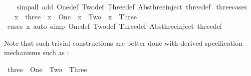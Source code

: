 \begin{isabellebody}
%
\isadelimproof
\ \ %
\endisadelimproof
%
\isatagproof
{}\isamarkupfalse%
\ {}simp{}all\ add{}\ One{}def\ Two{}def\ Three{}def\ Abs{}three{}inject\ three{}def{}%
\endisatagproof
{\isafoldproof}%
%
\isadelimproof
\isanewline
%
\endisadelimproof
\isanewline
{}\isamarkupfalse%
\ three{}cases{}\isanewline
\ \ \ x\ {}{}\ three\ \ {}x\ {}\ One{}\ {}\ {}x\ {}\ Two{}\ {}\ {}x\ {}\ Three{}\isanewline
%
\isadelimproof
\ \ %
\endisadelimproof
%
\isatagproof
{}\isamarkupfalse%
\ {}cases\ x{}\ {}auto\ simp{}\ One{}def\ Two{}def\ Three{}def\ Abs{}three{}inject\ three{}def{}%
\endisatagproof
{\isafoldproof}%
%
\isadelimproof
%
\endisadelimproof
%
\begin{isamarkuptext}%
Note that such trivial constructions are better done with
  derived specification mechanisms such as \hyperlink{command.datatype}{\mbox{}}:%
\end{isamarkuptext}%
\isamarkuptrue%
\isamarkupfalse%
\ three{}\ {}\ One{}\ {}\ Two{}\ {}\ Three{}%
\begin{isamarkuptext}%

\end{isamarkuptext}
\end{isabellebody}
